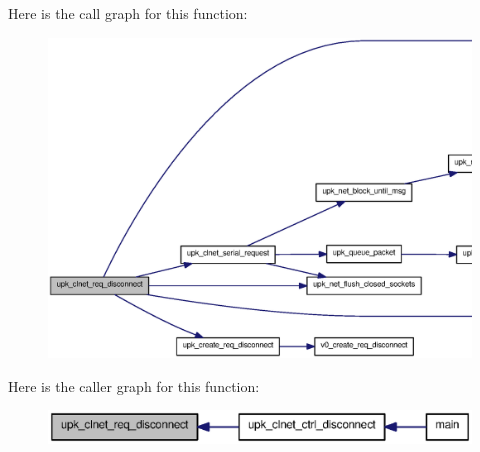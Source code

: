 Here is the call graph for this function:
\nopagebreak
\begin{figure}[H]
\begin{center}
\leavevmode
\includegraphics[width=360pt]{upk__client__net_8c_af573b85764e9dc557daed0b1b2ee0bf6_cgraph}
\end{center}
\end{figure}




Here is the caller graph for this function:
\nopagebreak
\begin{figure}[H]
\begin{center}
\leavevmode
\includegraphics[width=340pt]{upk__client__net_8c_af573b85764e9dc557daed0b1b2ee0bf6_icgraph}
\end{center}
\end{figure}


